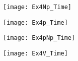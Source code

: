 \begin{landscape}
\begin{figure}[!htp]
\centering
\texttt{[image: Ex4Np\_Time]}
\caption{} 
\label{}
\end{figure}
\end{landscape}

\begin{landscape}
\begin{figure}[!htp]
\centering
\texttt{[image: Ex4p\_Time]}
\caption{} 
\label{}
\end{figure}
\end{landscape}

\begin{landscape}
\begin{figure}[!htp]
\centering
\texttt{[image: Ex4pNp\_Time]}
\caption{} 
\label{}
\end{figure}
\end{landscape}

\begin{landscape}
\begin{figure}[!htp]
\centering
\texttt{[image: Ex4V\_Time]}
\caption{} 
\label{}
\end{figure}
\end{landscape}




